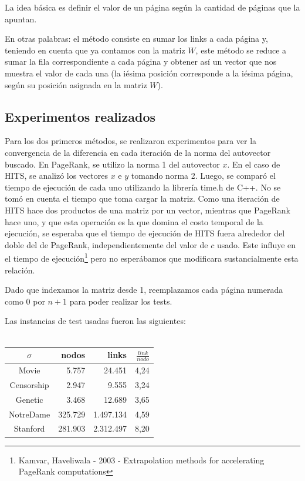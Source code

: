 \documentclass[a4paper]{article}
\begin{document}
La idea b\'asica es definir el valor de un p\'agina seg\'un la cantidad de p\'aginas que la apuntan.

En otras palabras: el método consiste en sumar los links a cada página y, teniendo en cuenta que ya contamos con la matriz $W$, este método se reduce a sumar la fila correspondiente a cada página y obtener as\'i un vector que nos muestra el valor de cada una (la i\'esima posición corresponde a la iésima página, según su posición asignada en la matriz $W$). 


\subsection{Experimentos realizados}
Para los dos primeros métodos, se realizaron experimentos para ver la convergencia de la diferencia en cada iteración de la norma del autovector buscado. En PageRank, se utilizo la norma 1 del autovector $x$. En el caso de HITS, se analizó los vectores $x$ e $y$ tomando norma 2.
Luego, se comparó el tiempo de ejecución de cada uno utilizando la librería time.h de C++. No se tomó en cuenta el tiempo que toma cargar la matriz. Como una iteración de HITS hace dos productos de una matriz por un vector, mientras que PageRank hace uno, y que esta operación es la que domina el costo temporal de la ejecución, se esperaba que el tiempo de ejecución de HITS fuera alrededor del doble del de PageRank, independientemente del valor de $c$ usado. Este influye en el tiempo de ejecución\footnote{Kamvar, Haveliwala - 2003 - Extrapolation methods for accelerating PageRank computations} pero no esperábamos que modificara sustancialmente esta relación.

Dado que indexamos la matriz desde 1, reemplazamos cada página numerada como 0 por $n+1$ para poder realizar los tests.

Las instancias de test usadas fueron las siguientes:\\ \\
\begin{tabular}{c|r |r |r}
$\sigma$ & nodos & links & $\frac{link}{nodo}$\\
\hline
Movie & 5.757 & 24.451 & 4,24\\
\hline
Censorship & 2.947 & 9.555 & 3,24\\
\hline
Genetic & 3.468 & 12.689 & 3,65 \\
\hline
NotreDame & 325.729 & 1.497.134 & 4,59 \\
\hline
Stanford & 281.903 & 2.312.497 & 8,20 \\
\end{tabular}
\end{document}
